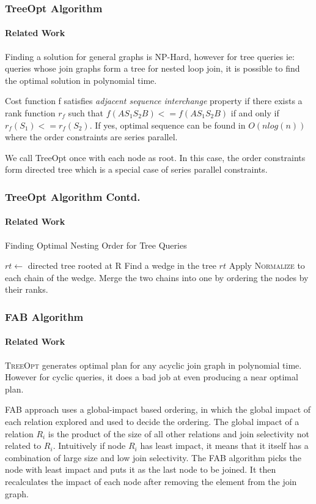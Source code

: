 \documentclass{beamer}
\begin{document}
  \begin{frame}
  \frametitle{TreeOpt Algorithm}
  \framesubtitle{Related Work}
Finding a solution for general graphs is NP-Hard, however for tree queries ie: queries whose join graphs form a tree for nested loop join, it is possible to find the optimal solution in polynomial time. \vspace{\baselineskip}

Cost function f satisfies \textit{adjacent sequence interchange} property if there exists a rank function $r_{f}$ such that $f(AS_{1}S_{2}B) <= f(AS_{1}S_{2}B)$ if and only if $r_{f}(S_{1}) <= r_{f}(S_{2})$. If yes, optimal sequence can be found in $O(n log(n))$ where the order constraints are series parallel. \vspace{\baselineskip}

We call TreeOpt once with each node as root. In this case, the order constraints form directed tree which is a special case of series parallel constraints. 
\end{frame}
\begin{frame}
\frametitle{TreeOpt Algorithm Contd.}
  \framesubtitle{Related Work}
\begin{algorithm}[H]
  \caption{Finding Optimal Nesting Order for Tree Queries
    \label{alg:treeopt}}
	\begin{algorithmic}[1]
		\State $rt \gets$ directed tree rooted at R   
			\State Find a wedge in the tree $rt$
			\State Apply \textsc{Normalize} to each chain of the wedge.
			\State Merge the two chains into one by ordering the nodes by their ranks.		
		\EndWhile
	\EndFunction
  \end{algorithmic}
\end{algorithm}
  \end{frame}

  \begin{frame}
  \frametitle{FAB Algorithm}
  \framesubtitle{Related Work}
 \textsc{TreeOpt} generates optimal plan for any acyclic join graph in polynomial time. However for cyclic queries, it does a bad job at even producing a near optimal plan. \vspace{\baselineskip}
 
FAB approach uses a global-impact based ordering, in which the global impact of each relation explored and used to decide the ordering. The global impact of a  relation $R_{i}$ is the product of the size of all other relations and join selectivity not related to $R_{i}$. Intuitively if node $R_{i}$ has least impact, it means that it itself has a combination of large size and low join selectivity. The FAB algorithm picks the node with least impact and puts it as the last node to be joined. It then recalculates the impact of each node after removing the element from the join graph.

  \end{frame}
\end{document}
